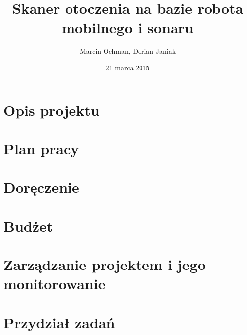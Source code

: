 \documentclass[a4paper]{article}
\begin{document}
\begin{titlepage}
   	\title{Skaner otoczenia na bazie robota mobilnego i sonaru}
	\author{Marcin Ochman, Dorian Janiak}
	\date{21 marca 2015}

\maketitle
\end{titlepage}



\section{Opis projektu}


\section{Plan pracy}


\section{Doręczenie}


\section{Budżet}


\section{Zarządzanie projektem i jego monitorowanie}


\section{Przydział zadań}

\end{document}
